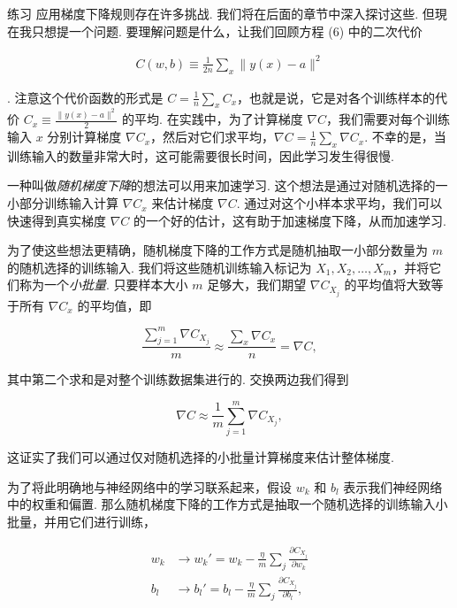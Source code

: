 \begin{exerciseBox}{练习}
应用梯度下降规则存在许多挑战. 我们将在后面的章节中深入探讨这些. 但現在我只想提一个问题. 要理解问题是什么，让我们回顾方程 (6) 中的二次代价

\begin{align*}
C(w,b) \equiv \frac{1}{2n} \sum_x \| y(x) - a\|^2 \nonumber
\end{align*}

\noindent. 注意这个代价函数的形式是 $C = \frac{1}{n} \sum_x C_x$，也就是说，它是对各个训练样本的代价 $C_x \equiv \frac{\|y(x)-a\|^2}{2}$ 的平均. 在实践中，为了计算梯度 $\nabla C$，我们需要对每个训练输入 $x$ 分别计算梯度 $\nabla C_x$，然后对它们求平均，$\nabla C = \frac{1}{n} \sum_x \nabla C_x$. 不幸的是，当训练输入的数量非常大时，这可能需要很长时间，因此学习发生得很慢.

一种叫做\emph{随机梯度下降}的想法可以用来加速学习. 这个想法是通过对随机选择的一小部分训练输入计算 $\nabla C_x$ 来估计梯度 $\nabla C$. 通过对这个小样本求平均，我们可以快速得到真实梯度 $\nabla C$ 的一个好的估计，这有助于加速梯度下降，从而加速学习.

为了使这些想法更精确，随机梯度下降的工作方式是随机抽取一小部分数量为 $m$ 的随机选择的训练输入. 我们将这些随机训练输入标记为 $X_1, X_2, \ldots, X_m$，并将它们称为一个\emph{小批量}. 只要样本大小 $m$ 足够大，我们期望 $\nabla C_{X_j}$ 的平均值将大致等于所有 $\nabla C_x$ 的平均值，即

\begin{equation}
\frac{\sum_{j=1}^m \nabla C_{X_{j}}}{m} \approx \frac{\sum_x \nabla C_x}{n} = \nabla C,
\tag{18}
\end{equation}

\noindent 其中第二个求和是对整个训练数据集进行的. 交换两边我们得到

\begin{equation}
\nabla C \approx \frac{1}{m} \sum_{j=1}^m \nabla C_{X_{j}},
\tag{19}
\end{equation}

\noindent 这证实了我们可以通过仅对随机选择的小批量\label{term:37}计算梯度来估计整体梯度.

为了将此明确地与神经网络中的学习联系起来，假设 $w_k$ 和 $b_l$ 表示我们神经网络中的权重和偏置. 那么随机梯度下降的工作方式是抽取一个随机选择的训练输入小批量，并用它们进行训练，

\begin{align}
w_k &\rightarrow w_k' = w_k-\frac{\eta}{m} \sum_j \frac{\partial C_{X_j}}{\partial w_k} \tag{20} \\ b_l &\rightarrow b_l' = b_l-\frac{\eta}{m} \sum_j \frac{\partial C_{X_j}}{\partial b_l}, \tag{21}
\end{align}


\end{exerciseBox}
